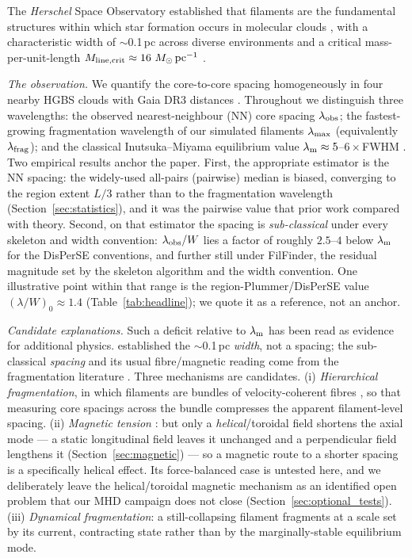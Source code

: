 \documentclass[usenatbib,twoside,twocolumn]{mnras}
\begin{document}
The \textit{Herschel} Space Observatory established that filaments are the fundamental structures within which star formation occurs in molecular clouds \citep{Andre2010}, with a characteristic width of $\sim$0.1\,pc across diverse environments \citep{Arzoumanian2011} and a critical mass-per-unit-length $M_{\rm line,crit}\approx16~M_\odot\,{\rm pc^{-1}}$ \citep{Ostriker1964}.

\emph{The observation.} We quantify the core-to-core spacing homogeneously in four nearby HGBS clouds with Gaia DR3 distances \citep{Zhang2023}. Throughout we distinguish three wavelengths: the observed nearest-neighbour (NN) core spacing $\lambda_{\rm obs}$; the fastest-growing fragmentation wavelength of our simulated filaments $\lambda_{\rm max}$ (equivalently $\lambda_{\rm frag}$); and the classical Inutsuka--Miyama equilibrium value $\lambda_{\rm m}\approx5$--$6\times$FWHM \citep{Inutsuka1992,Fischera2012}. Two empirical results anchor the paper. First, the appropriate estimator is the NN spacing: the widely-used all-pairs (pairwise) median is biased, converging to the region extent $L/3$ rather than to the fragmentation wavelength (Section~\ref{sec:statistics}), and it was the pairwise value that prior work compared with theory. Second, on that estimator the spacing is \emph{sub-classical} under every skeleton and width convention: $\lambda_{\rm obs}/W$ lies a factor of roughly $2.5$--$4$ below $\lambda_{\rm m}$ for the DisPerSE conventions, and further still under FilFinder, the residual magnitude set by the skeleton algorithm and the width convention. One illustrative point within that range is the region-Plummer/DisPerSE value $(\lambda/W)_0\approx1.4$ (Table~\ref{tab:headline}); we quote it as a reference, not an anchor.

\emph{Candidate explanations.} Such a deficit relative to $\lambda_{\rm m}$ has been read as evidence for additional physics. \citet{Arzoumanian2019} established the $\sim$0.1\,pc \emph{width}, not a spacing; the sub-classical \emph{spacing} and its usual fibre/magnetic reading come from the fragmentation literature \citep{Fischera2012,Zhang2023cal}. Three mechanisms are candidates. (i) \emph{Hierarchical fragmentation}, in which filaments are bundles of velocity-coherent fibres \citep{Hacar2013,Hacar2018,Yang2024}, so that measuring core spacings across the bundle compresses the apparent filament-level spacing. (ii) \emph{Magnetic tension} \citep{Nakamura1993}: but only a \emph{helical}/toroidal field shortens the axial mode --- a static longitudinal field leaves it unchanged and a perpendicular field lengthens it (Section~\ref{sec:magnetic}) --- so a magnetic route to a shorter spacing is a specifically helical effect. Its force-balanced case is untested here, and we deliberately leave the helical/toroidal magnetic mechanism as an identified open problem that our MHD campaign does not close (Section~\ref{sec:optional_tests}). (iii) \emph{Dynamical fragmentation}: a still-collapsing filament fragments at a scale set by its current, contracting state rather than by the marginally-stable equilibrium mode.
\end{document}
